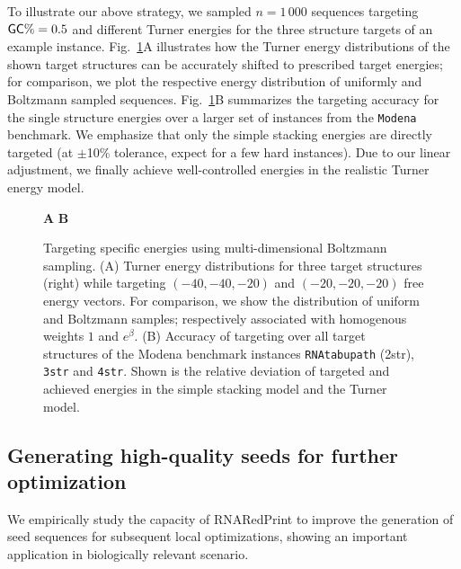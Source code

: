 \documentclass{bioinfo}
\makeatletter
\newlength{\@aligneps}
\newcommand{\includegraphicstop}[2][]{%
\sbox{\@alignepsbox}{\texttt{[image: \#2]}}%
\setlength{\@aligneps}{-\ht\@alignepsbox}%
\addtolength{\@aligneps}{2ex}%
\raisebox{\@aligneps}{\usebox{\@alignepsbox}}}
\newcommand{\Software}[1]{{\ttfamily #1}}
\newcommand{\ourprog}{\Software{RNARedPrint}}
\makeatother
\begin{document}
To illustrate our above strategy, we sampled $n=1\,000$ sequences
targeting ${\sf GC}\%=0.5$ and different Turner energies for the three
structure targets of an example instance. Fig.~\ref{fig:energydist}A
illustrates how the Turner energy distributions of the shown target
structures can be accurately shifted to prescribed target energies;
for comparison, we plot the respective energy distribution of
uniformly and Boltzmann sampled sequences. Fig.~\ref{fig:energydist}B
summarizes the targeting accuracy for the single structure energies
over a larger set of instances from the \texttt{Modena} benchmark. We
emphasize that only the simple stacking energies are directly targeted
(at $\pm$10\% tolerance, expect for a few hard instances). Due to our
linear adjustment, we finally achieve well-controlled energies in the
realistic Turner energy model.
\begin{figure}[t]
  \begin{center}
    {\sf \bfseries A}\includegraphicstop[width=0.57\textwidth]{Figs/energy_distribution}
    {\sf \bfseries B}\includegraphicstop[width=0.32\textwidth]{Figs/offset}
  \end{center}
  \caption{%
  	Targeting specific energies using multi-dimensional Boltzmann sampling. (A) Turner energy distributions for three target structures (right) while targeting $(-40,-40,-20)$ and $(-20,-20,-20)$ free energy vectors. For comparison, we show the distribution of uniform and Boltzmann samples; respectively associated with homogenous weights $1$ and $e^\beta$. (B) Accuracy of targeting over all target structures of the \Software{Modena} benchmark instances \texttt{RNAtabupath} (2str), \texttt{3str} and \texttt{4str}. Shown is the relative deviation of targeted and achieved energies in the simple stacking model and the Turner model.
}
  \label{fig:energydist}
\end{figure}
\subsection{Generating high-quality seeds for further optimization}
We empirically study the capacity of \ourprog{} to improve the generation of seed sequences for subsequent local optimizations, showing an important application in biologically relevant scenario.
\end{document}
